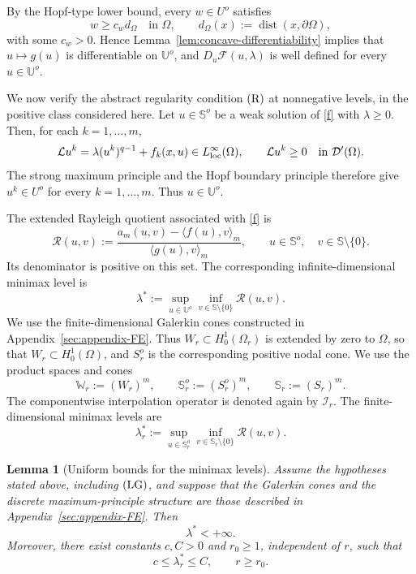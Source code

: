 \documentclass[preprint,10pt]{elsarticle}
\numberwithin{equation}{section}
\newtheorem{lem}[thm]{Lemma}
\begin{document}
By the Hopf-type lower bound, every \(w\in U^o\) satisfies
\[
w\ge c_w d_\Omega \quad\text{in }\Omega,
\qquad
d_\Omega(x):=\operatorname{dist}(x,\partial\Omega),
\]
with some \(c_w>0\). Hence
Lemma~\ref{lem:concave-differentiability} implies that
\(u\mapsto g(u)\) is differentiable on \(\mathbb U^o\), and
\(D_u\mathcal F(u,\lambda)\) is well defined for every
\(u\in\mathbb U^o\).

We now verify the abstract regularity condition \({\rm (R)}\) at
nonnegative levels, in the positive class considered here. Let
\(u\in\mathbb S^o\) be a weak solution of \eqref{f} with \(\lambda\ge0\).
Then, for each \(k=1,\ldots,m\),
\[
\mathcal L u^k
=
\lambda (u^k)^{q-1}+f_k(x,u)
\in L^\infty_{\rm loc}(\Omega),
\qquad
\mathcal L u^k\ge0
\quad\text{in }\mathcal D'(\Omega).
\]
The strong maximum principle and the Hopf boundary principle therefore give
\(u^k\in U^o\) for every \(k=1,\ldots,m\). Thus \(u\in\mathbb U^o\).

The extended Rayleigh quotient associated with \eqref{f} is
\[
\mathcal R(u,v):=
\frac{
	a_m(u,v)-\langle f(u),v\rangle_m
}{
	\langle g(u),v\rangle_m
},
\qquad
u\in\mathbb S^o,\quad v\in\mathbb S\setminus\{0\}.
\]
Its denominator is positive on this set. The corresponding
infinite-dimensional minimax level is
\[
\lambda^*
:=
\sup_{u\in\mathbb U^o}
\inf_{v\in\mathbb S\setminus\{0\}}
\mathcal R(u,v).
\]
We use the finite-dimensional Galerkin cones constructed in
Appendix~\ref{sec:appendix-FE}. Thus \(W_r\subset H_0^1(\Omega_r)\) is
extended by zero to \(\Omega\), so that \(W_r\subset H_0^1(\Omega)\), and
\(S_r^o\) is the corresponding positive nodal cone.
We use the product spaces
and cones
\[
\mathbb W_r:=(W_r)^m,
\qquad
\mathbb S_r^o:=(S_r^o)^m,
\qquad
\mathbb S_r:=(S_r)^m .
\]
The componentwise interpolation operator is denoted again by
\(\mathcal I_r\). The finite-dimensional minimax levels are
\[
\lambda_r^*
:=
\sup_{u\in\mathbb S_r^o}
\inf_{v\in\mathbb S_r\setminus\{0\}}
\mathcal R(u,v).
\]


\begin{lem}[Uniform bounds for the minimax levels]
	\label{lem:bounds-lambda}
	Assume the hypotheses stated above, including \({\rm (LG)}\), and suppose
	that the Galerkin cones and the discrete maximum-principle structure are those
	described in Appendix~\ref{sec:appendix-FE}.
	Then
	\[
	\lambda^*<+\infty .
	\]
	Moreover, there exist constants \(c,C>0\) and \(r_0\ge1\), independent of
	\(r\), such that
	\[
	c\le \lambda_r^*\le C,
	\qquad r\ge r_0 .
	\]
\end{lem}
\end{document}
